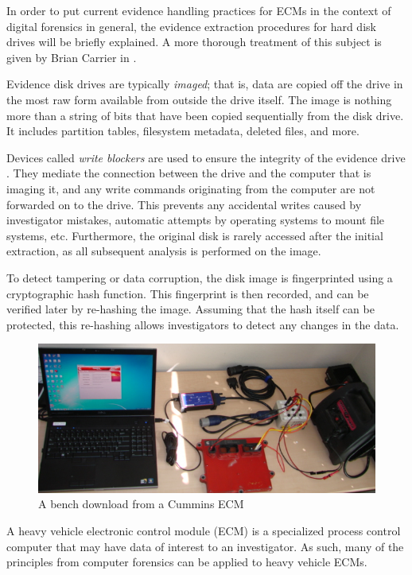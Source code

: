 In order to put current evidence handling practices for ECMs in the context of digital forensics in general, the evidence extraction
procedures for hard disk drives will be briefly explained. A more thorough treatment of this subject is given by Brian Carrier in \cite{carrier2005}.

Evidence disk drives are typically \emph{imaged}; that is, data are copied off the drive in the most raw form available from outside
the drive itself. The image is nothing more than a string of bits that have been copied sequentially from the disk drive. It includes
partition tables, filesystem metadata, deleted files, and more.

Devices called \emph{write blockers} are used to ensure the integrity of the evidence drive \cite{carrier2005}. They mediate the connection between the
drive and the computer that is imaging it, and any write commands originating from the computer are not forwarded on to the drive.
This prevents any accidental writes caused by investigator mistakes, automatic attempts by operating systems to mount file systems, etc.
Furthermore, the original disk is rarely accessed after the initial extraction, as all subsequent analysis is performed on the image.

To detect tampering or data corruption, the disk image is fingerprinted using a cryptographic hash function. This fingerprint is then recorded,
and can be verified later by re-hashing the image. Assuming that the hash itself can be protected, this re-hashing allows investigators to
detect any changes in the data.

\begin{figure}[h]
  \center
  \includegraphics[scale=0.5]{cumminsbench}
  \caption{A bench download from a Cummins ECM}
  \label{fig:cumminsbench}
\end{figure}


A heavy vehicle electronic control module (ECM) is a specialized process control computer that may have data of interest to an investigator. 
 As such, many of the principles from computer forensics can be applied to heavy vehicle ECMs.

